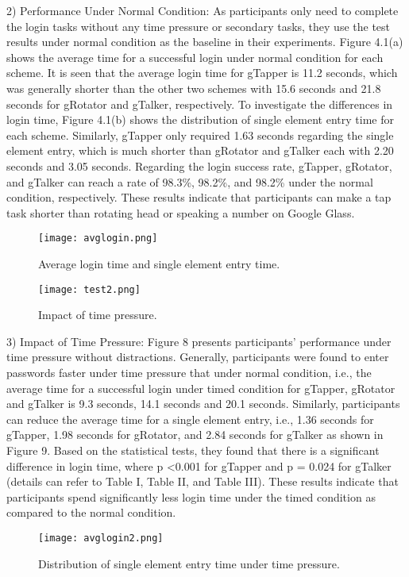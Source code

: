 \documentclass[12pt,a4paper,oneside]{report}
\begin{document}
\par
2) Performance Under Normal Condition: As participants
only need to complete the login tasks without any time
pressure or secondary tasks, they use the test results under
normal condition as the baseline in their experiments.
Figure 4.1(a) shows the average time for a successful login
under normal condition for each scheme. It is seen that the
average login time for gTapper is 11.2 seconds, which was
generally shorter than the other two schemes with 15.6 seconds and 21.8 seconds for gRotator and gTalker, respectively.
To investigate the differences in login time, Figure 4.1(b) shows
the distribution of single element entry time for each scheme.
Similarly, gTapper only required 1.63 seconds regarding the
single element entry, which is much shorter than gRotator and
gTalker each with 2.20 seconds and 3.05 seconds. Regarding
the login success rate, gTapper, gRotator, and gTalker can
reach a rate of 98.3\%, 98.2\%, and 98.2\% under the normal
condition, respectively. These results indicate that participants
can make a tap task shorter than rotating head or speaking a
number on Google Glass.


\begin{figure}[H]
    \begin{center}
        \label{abc}
            \texttt{[image: avglogin.png]}
            \caption{ Average login time and single element entry time.}
    \end{center}
\end{figure}
\begin{figure}[H]
    \begin{center}
        \label{abc}
            \texttt{[image: test2.png]}
            \caption{ Impact of time pressure.}
    \end{center}
\end{figure}

\par
3) Impact of Time Pressure: Figure 8 presents participants’ performance under time pressure without distractions.
Generally, participants were found to enter passwords faster under time pressure that under normal condition, i.e., the
average time for a successful login under timed condition for
gTapper, gRotator and gTalker is 9.3 seconds, 14.1 seconds and
20.1 seconds. Similarly, participants can reduce the average
time for a single element entry, i.e., 1.36 seconds for gTapper,
1.98 seconds for gRotator, and 2.84 seconds for gTalker as
shown in Figure 9. Based on the statistical tests, they found
that there is a significant difference in login time, where
p \textless 0.001 for gTapper and p = 0.024 for gTalker (details can
refer to Table I, Table II, and Table III). These
results indicate that participants spend significantly less login time under the timed condition as compared to the normal
condition.
\begin{figure}[H]
    \begin{center}
        \label{abc}
            \texttt{[image: avglogin2.png]}
            \caption{ Distribution of single element entry time under time pressure.}
    \end{center}
\end{figure}
\end{document}
